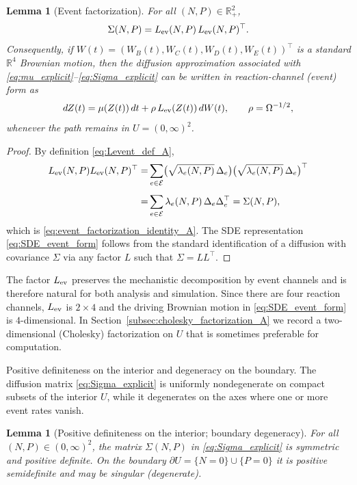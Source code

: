 \documentclass[pdflatex,sn-mathphys-ay]{sn-jnl}
\theoremstyle{thmstyleone}
\newtheorem{lemma}[theorem]{Lemma}
\theoremstyle{definition}
\theoremstyle{remark}
\begin{document}
\begin{lemma}[Event factorization]\label{lem:event_factorization_A}
For all $(N,P)\in\mathbb{R}_+^2$,
\begin{equation}\label{eq:event_factorization_identity_A}
\Sigma(N,P)=L_{\rm ev}(N,P)\,L_{\rm ev}(N,P)^\top .
\end{equation}
Consequently, if $W(t)=(W_B(t),W_C(t),W_D(t),W_E(t))^\top$ is a standard $\mathbb{R}^4$ Brownian motion, then the
diffusion approximation associated with \eqref{eq:mu_explicit}--\eqref{eq:Sigma_explicit} can be written in
reaction-channel (event) form as
\begin{equation}\label{eq:SDE_event_form}
dZ(t)=\mu(Z(t))\,dt+\rho\,L_{\rm ev}(Z(t))\,dW(t),
\qquad \rho=\Omega^{-1/2},
\end{equation}
whenever the path remains in $U=(0,\infty)^2$.
\end{lemma}

\begin{proof}
By definition \eqref{eq:Levent_def_A},
\begin{align*}
L_{\rm ev}(N,P)L_{\rm ev}(N,P)^\top
=&\sum_{e\in\mathcal E}
\bigl(\sqrt{\lambda_e(N,P)}\,\Delta_e\bigr)\bigl(\sqrt{\lambda_e(N,P)}\,\Delta_e\bigr)^\top \\[4pt]
=&\sum_{e\in \mathcal E}\lambda_e(N,P)\,\Delta_e\Delta_e^\top
=\Sigma(N,P),
\end{align*}
which is \eqref{eq:event_factorization_identity_A}. The SDE representation \eqref{eq:SDE_event_form} follows from the
standard identification of a diffusion with covariance $\Sigma$ via any factor $L$ such that $\Sigma=LL^\top$.
\end{proof}

The factor $L_{\rm ev}$ preserves the mechanistic decomposition by event channels and is therefore natural for both
analysis and simulation. Since there are four reaction channels, $L_{\rm ev}$ is $2\times4$ and the driving Brownian
motion in \eqref{eq:SDE_event_form} is $4$-dimensional. In Section~\ref{subsec:cholesky_factorization_A} we record a
two-dimensional (Cholesky) factorization on $U$ that is sometimes preferable for computation.

Positive definiteness on the interior and degeneracy on the boundary. The diffusion matrix \eqref{eq:Sigma_explicit} is uniformly nondegenerate on compact subsets of the interior $U$,
while it degenerates on the axes where one or more event rates vanish.

\begin{lemma}[Positive definiteness on the interior; boundary degeneracy]\label{lem:Sigma_posdef_A}
For all $(N,P)\in(0,\infty)^2$, the matrix $\Sigma(N,P)$ in \eqref{eq:Sigma_explicit} is symmetric and positive
definite. On the boundary $\partial U=\{N=0\}\cup\{P=0\}$ it is positive semidefinite and may be singular (degenerate).
\end{lemma}
\end{document}
